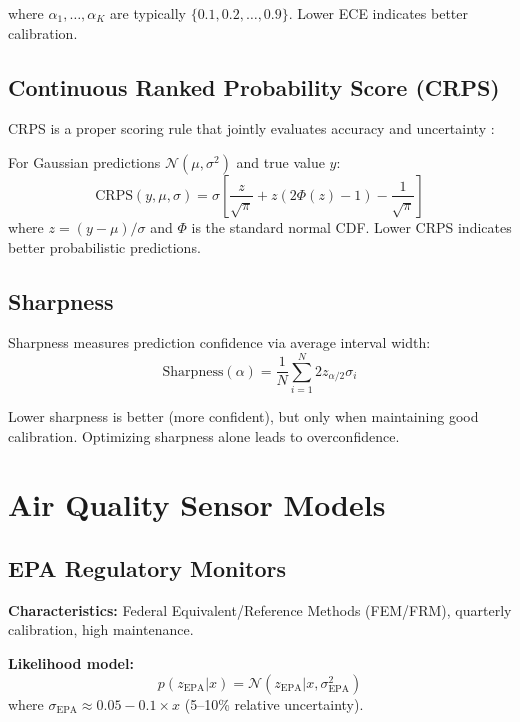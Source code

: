 \documentclass[11pt,letterpaper]{article}
\newcommand{\Normal}{\mathcal{N}}
\begin{document}
where $\alpha_1, \ldots, \alpha_K$ are typically $\{0.1, 0.2, \ldots, 0.9\}$. Lower ECE indicates better calibration.

\subsection{Continuous Ranked Probability Score (CRPS)}

CRPS is a proper scoring rule that jointly evaluates accuracy and uncertainty \citep{gneiting2007strictly}:

For Gaussian predictions $\Normal(\mu, \sigma^2)$ and true value $y$:
\begin{equation}
\text{CRPS}(y, \mu, \sigma) = \sigma \left[ \frac{z}{\sqrt{\pi}} + z(2\Phi(z) - 1) - \frac{1}{\sqrt{\pi}} \right]
\label{eq:crps}
\end{equation}
where $z = (y - \mu)/\sigma$ and $\Phi$ is the standard normal CDF. Lower CRPS indicates better probabilistic predictions.

\subsection{Sharpness}

Sharpness measures prediction confidence via average interval width:
\begin{equation}
\text{Sharpness}(\alpha) = \frac{1}{N} \sum_{i=1}^{N} 2 z_{\alpha/2} \sigma_i
\label{eq:sharpness}
\end{equation}

Lower sharpness is better (more confident), but only when maintaining good calibration. Optimizing sharpness alone leads to overconfidence.

\section{Air Quality Sensor Models} \label{sec:sensors}

\subsection{EPA Regulatory Monitors}

\textbf{Characteristics:} Federal Equivalent/Reference Methods (FEM/FRM), quarterly calibration, high maintenance.

\textbf{Likelihood model:}
\begin{equation}
p(z_{\text{EPA}} | x) = \Normal(z_{\text{EPA}} | x, \sigma^2_{\text{EPA}})
\label{eq:epa_likelihood}
\end{equation}
where $\sigma_{\text{EPA}} \approx 0.05-0.1 \times x$ (5--10\% relative uncertainty).
\end{document}
